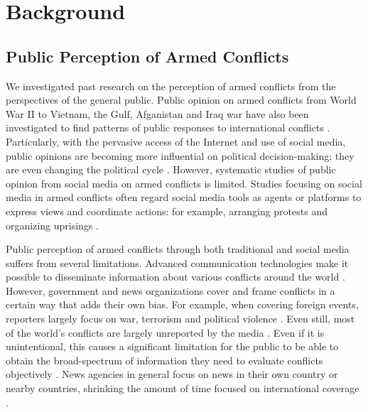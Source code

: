\section{Background}
\subsection{Public Perception of Armed Conflicts}
We investigated past research on the perception of armed conflicts from the perspectives of the general public. Public opinion on armed conflicts from World War II to Vietnam, the Gulf, Afganistan and Iraq war have also been investigated to find patterns of public responses to international conflicts \cite{Berinsky2009}. Particularly, with the pervasive access of the Internet and use of social media, public opinions are becoming more influential on political decision-making; they are even changing the political cycle \cite{Shirky2011}. However, systematic studies of public opinion from social media on armed conflicts is limited. Studies focusing on social media in armed conflicts often regard social media tools as agents or platforms to express views and coordinate actions: for example, arranging protests and organizing uprisings \cite{Lim2012}.

Public perception of armed conflicts through both traditional and social media suffers from several limitations. Advanced communication technologies make it possible to disseminate information about various conflicts around the world \cite{Sacco2015}. However, government and news organizations cover and frame conflicts in a certain way that adds their own bias. For example, when covering foreign events, reporters largely focus on war, terrorism and political violence \cite{Nossek2004}. Even still, most of the world's conflicts are largely unreported by the media \cite{Hawkins2011}. Even if it is unintentional, this causes a significant limitation for the public to be able to obtain the broad-spectrum of information they need to evaluate conflicts objectively \cite{Nelson1997}. News agencies in general focus on news in their own country or nearby countries, shrinking the amount of time focused on international coverage \cite{Seib2004}.

